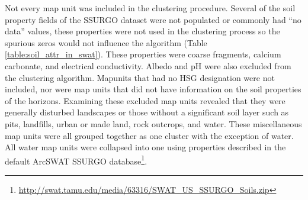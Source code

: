 Not every map unit was included in the clustering procedure. Several of the soil
property fields of the SSURGO dataset were not populated or commonly had ``no
data'' values, these properties were not used in the clustering process so the
spurious zeros would not influence the algorithm (Table
\ref{table:soil_attr_in_swat}). These properties were coarse fragments, calcium
carbonate, and electrical conductivity. Albedo and pH were also excluded from
the clustering algorithm. Mapunits that had no HSG designation were not
included, nor were map units that did not have information on the soil
properties of the horizons. Examining these excluded map units revealed that
they were generally disturbed landscapes or those without a significant soil
layer such as pits, landfills, urban or made land, rock outcrops, and water.
These miscellaneous map units were all grouped together as one cluster with the
exception of water. All water map units were collapsed into one using properties
described in the default ArcSWAT SSURGO
database\footnote{\url{http://swat.tamu.edu/media/63316/SWAT_US_SSURGO_Soils.zip}}.


